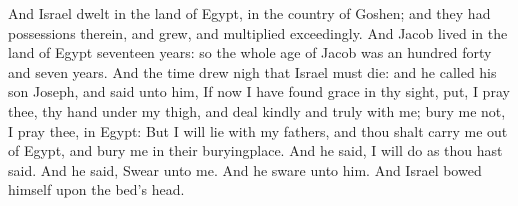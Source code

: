 \begin{biblechapter}
\verse And Israel dwelt in the land of Egypt, in the country of Goshen; and they had possessions therein, and grew, and multiplied exceedingly.
\verse And Jacob lived in the land of Egypt seventeen years: so the whole age of Jacob was an hundred forty and seven years.
\verse And the time drew nigh that Israel must die: and he called his son Joseph, and said unto him, If now I have found grace in thy sight, put, I pray thee, thy hand under my thigh, and deal kindly and truly with me; bury me not, I pray thee, in Egypt:
\verse But I will lie with my fathers, and thou shalt carry me out of Egypt, and bury me in their buryingplace. And he said, I will do as thou hast said.
\verse And he said, Swear unto me. And he sware unto him. And Israel bowed himself upon the bed's head.
\end{biblechapter}

